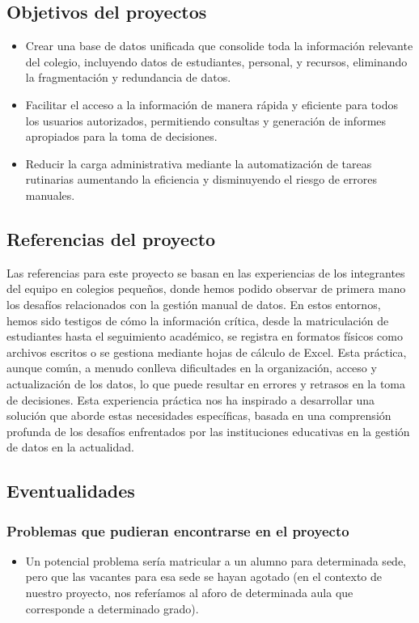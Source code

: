 \subsection{Objetivos del proyectos}
\begin{itemize}
	\item Crear una base de datos unificada que consolide toda la información relevante del colegio, incluyendo datos de estudiantes, personal, y recursos, eliminando la fragmentación y redundancia de datos.
	\item Facilitar el acceso a la información de manera rápida y eficiente para todos los usuarios autorizados, permitiendo consultas y generación de informes apropiados para la toma de decisiones.
	\item Reducir la carga administrativa mediante la automatización de tareas rutinarias aumentando la eficiencia y disminuyendo el riesgo de errores manuales.
\end{itemize}
\subsection{Referencias del proyecto}
Las referencias para este proyecto se basan en las experiencias de los integrantes del equipo en colegios pequeños, donde hemos podido observar de primera mano los desafíos relacionados con la gestión manual de datos. En estos entornos, hemos sido testigos de cómo la información crítica, desde la matriculación de estudiantes hasta el seguimiento académico, se registra en formatos físicos como archivos escritos o se gestiona mediante hojas de cálculo de Excel. Esta práctica, aunque común, a menudo conlleva dificultades en la organización, acceso y actualización de los datos, lo que puede resultar en errores y retrasos en la toma de decisiones. Esta experiencia práctica nos ha inspirado a desarrollar una solución que aborde estas necesidades específicas, basada en una comprensión profunda de los desafíos enfrentados por las instituciones educativas en la gestión de datos en la actualidad.
\subsection{Eventualidades}
\subsubsection{Problemas que pudieran encontrarse en el proyecto}
\begin{itemize}
	\item Un potencial problema sería matricular a un alumno para determinada sede, pero que las vacantes para esa sede se hayan agotado (en el contexto de nuestro proyecto, nos referíamos al aforo de determinada aula que corresponde a determinado grado).
\end{itemize}
